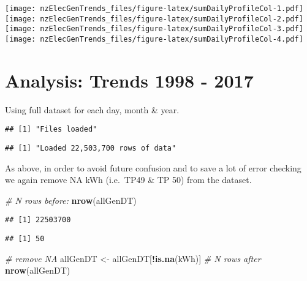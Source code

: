 \documentclass[]{article}
\newenvironment{Shaded}{\begin{snugshade}}{\end{snugshade}}
\newcommand{\KeywordTok}[1]{\textcolor[rgb]{0.13,0.29,0.53}{\textbf{#1}}}
\newcommand{\StringTok}[1]{\textcolor[rgb]{0.31,0.60,0.02}{#1}}
\newcommand{\CommentTok}[1]{\textcolor[rgb]{0.56,0.35,0.01}{\textit{#1}}}
\newcommand{\OperatorTok}[1]{\textcolor[rgb]{0.81,0.36,0.00}{\textbf{#1}}}
\newcommand{\NormalTok}[1]{#1}
\theoremstyle{definition}
\theoremstyle{definition}
\theoremstyle{definition}
\theoremstyle{remark}
\begin{document}
\texttt{[image: nzElecGenTrends\_files/figure-latex/sumDailyProfileCol-1.pdf]}
\texttt{[image: nzElecGenTrends\_files/figure-latex/sumDailyProfileCol-2.pdf]}
\texttt{[image: nzElecGenTrends\_files/figure-latex/sumDailyProfileCol-3.pdf]}
\texttt{[image: nzElecGenTrends\_files/figure-latex/sumDailyProfileCol-4.pdf]}

\section{Analysis: Trends 1998 -
2017}\label{analysis-trends-1998---2017}

Using full dataset for each day, month \& year.

\begin{verbatim}
## [1] "Files loaded"
\end{verbatim}

\begin{verbatim}
## [1] "Loaded 22,503,700 rows of data"
\end{verbatim}

As above, in order to avoid future confusion and to save a lot of error
checking we again remove NA kWh (i.e.~TP49 \& TP 50) from the dataset.

\begin{Shaded}
\begin{Highlighting}[]
\CommentTok{# N rows before:}
\KeywordTok{nrow}\NormalTok{(allGenDT)}
\end{Highlighting}
\end{Shaded}

\begin{verbatim}
## [1] 22503700
\end{verbatim}

\begin{Shaded}
\end{Shaded}

\begin{verbatim}
## [1] 50
\end{verbatim}

\begin{Shaded}
\begin{Highlighting}[]
\CommentTok{# remove NA}
\NormalTok{allGenDT <-}\StringTok{ }\NormalTok{allGenDT[}\OperatorTok{!}\KeywordTok{is.na}\NormalTok{(kWh)]}
\CommentTok{# N rows after}
\KeywordTok{nrow}\NormalTok{(allGenDT)}
\end{Highlighting}
\end{Shaded}
\end{document}
